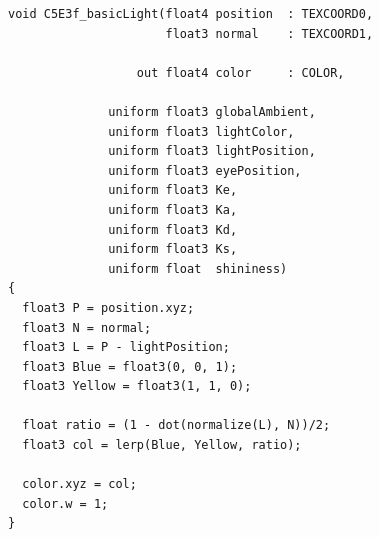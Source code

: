 \documentclass[letterpaper,11pt]{article}
\begin{document}
\begin{verbatim}
void C5E3f_basicLight(float4 position  : TEXCOORD0,                        
                      float3 normal    : TEXCOORD1,

                  out float4 color     : COLOR,

              uniform float3 globalAmbient,
              uniform float3 lightColor,
              uniform float3 lightPosition,
              uniform float3 eyePosition,
              uniform float3 Ke,
              uniform float3 Ka,
              uniform float3 Kd,
              uniform float3 Ks,
              uniform float  shininess)
{
  float3 P = position.xyz;
  float3 N = normal;
  float3 L = P - lightPosition;
  float3 Blue = float3(0, 0, 1);
  float3 Yellow = float3(1, 1, 0);

  float ratio = (1 - dot(normalize(L), N))/2;
  float3 col = lerp(Blue, Yellow, ratio);

  color.xyz = col;
  color.w = 1;
}

\end{verbatim}
\end{document}
